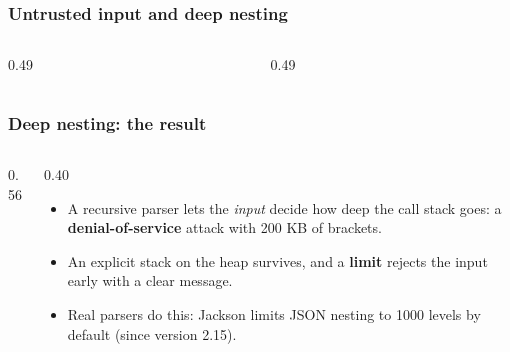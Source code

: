 \documentclass[aspectratio=169,10pt,compress]{beamer}
\begin{document}




\begin{frame}[t,fragile] \frametitle{Untrusted input and deep nesting}
  \begin{columns}[T]
    \begin{column}{0.49\textwidth}
    \end{column}
    \begin{column}{0.49\textwidth}
    \end{column}
  \end{columns}
\end{frame}




\begin{frame}[t,fragile] \frametitle{Deep nesting: the result}
  \begin{columns}[T]
    \begin{column}{0.56\textwidth}
    \end{column}
    \begin{column}{0.40\textwidth}
      \begin{itemize}\small
        \item A recursive parser lets the \emph{input} decide how deep the call stack goes: a \textbf{denial-of-service} attack with 200 KB of brackets.
        \item An explicit stack on the heap survives, and a \textbf{limit} rejects the input early with a clear message.
        \item Real parsers do this: Jackson limits JSON nesting to 1000 levels by default (since version 2.15).
      \end{itemize}
    \end{column}
  \end{columns}
\end{frame}
\end{document}
